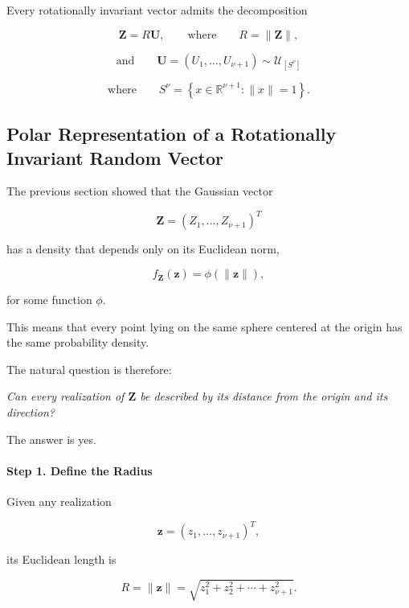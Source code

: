 \documentclass[11pt]{article}
\begin{document}
	Every rotationally invariant vector admits the decomposition
	
	\[
	\mathbf Z
	=
	R\mathbf U,
	\qquad 
	\text{where}
	\qquad 
	R=\|\mathbf Z\|,
	\] 
	
	\[ 
	\text{and}
	\qquad 
	\mathbf U
	=
	(U_1,\ldots,U_{\nu+1})
	\sim
	\mathcal{U}_{[S^\nu]}
	\]
	
	
	\[
	\text{where}
	\qquad S^\nu
	=
	\left\{
	x\in\mathbb R^{\nu+1}
	:
	\|x\|=1
	\right\}.
	\]
	
	\begin{mdframed}[
		linewidth=0.8pt,
		roundcorner=6pt,
		backgroundcolor=gray!5,
		linecolor=gray!60,
		innertopmargin=10pt,
		innerbottommargin=10pt,
		innerleftmargin=10pt,
		innerrightmargin=10pt
		]
		
		\subsection*{Polar Representation of a Rotationally Invariant Random Vector}
		
		The previous section showed that the Gaussian vector
		
		\[
		\mathbf Z=(Z_1,\ldots,Z_{\nu+1})^T
		\]
		
		has a density that depends only on its Euclidean norm,
		
		\[
		f_{\mathbf Z}(\mathbf z)
		=
		\phi(\|\mathbf z\|),
		\]
		
		for some function $\phi$.
		
		This means that every point lying on the same sphere centered at the origin
		has the same probability density.
		
		The natural question is therefore:
		
		\begin{center}
			\emph{Can every realization of $\mathbf Z$ be described by its distance
				from the origin and its direction?}
		\end{center}
		
		The answer is yes.
		
		\paragraph{Step 1. Define the Radius}
		
		Given any realization
		
		\[
		\mathbf z
		=
		(z_1,\ldots,z_{\nu+1})^T,
		\]
		
		its Euclidean length is
		
		\[
		R
		=
		\|\mathbf z\|
		=
		\sqrt{
			z_1^2+z_2^2+\cdots+z_{\nu+1}^2
		}.
		\]
		

\end{mdframed}
\end{document}
